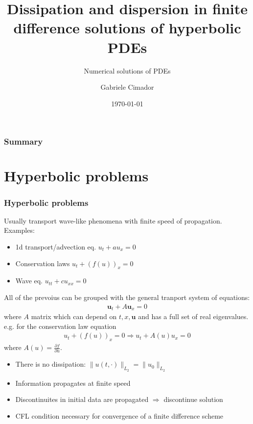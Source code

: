 \documentclass{beamer}
\title{Dissipation and dispersion in finite difference solutions of hyperbolic PDEs}
\subtitle{Numerical solutions of PDEs}
\author{Gabriele Cimador}
\institute{Data Science and Scientific computing at Università di Trieste}
\date{\today}
\begin{document}
\begin{frame}
\titlepage
\end{frame}
\begin{frame}
\frametitle{Summary}
\tableofcontents
\end{frame}
\section{Hyperbolic problems}
\begin{frame}
\frametitle{Hyperbolic problems}
Usually transport wave-like phenomena with finite speed of propagation. Examples:
\begin{itemize}
\setlength\itemsep{1em}
  \item 1d transport/advection eq. $u_t + a u_x = 0$
  \item Conservation laws $u_t + (f(u))_x = 0$
  \item Wave eq. $u_{tt} + cu_{xx} = 0$
\end{itemize}
\end{frame}
\begin{frame}
All of the prevoius can be grouped with the general tranport system of equations:
\begin{align*}
\bm{u}_t + A\bm{u}_x = 0
\end{align*}
where $A$ matrix which can depend on $t, x, \bm{u}$ and has a full set of real eigenvalues.
\\ e.g. for the conservation law equation
\begin{align*}
u_t + (f(u))_x = 0 \Rightarrow u_t + A(u)u_x = 0
\end{align*}
 where $A(u) = \frac{\partial f}{\partial u}$.
\end{frame}
\begin{frame}
\begin{itemize}
  \item There is no dissipation: $\lVert u(t,\cdot) \rVert_{L_2} = \lVert u_0\rVert_{L_2}$
  \item Information propagates at finite speed
  \item Discontinuites in initial data are propagated $\Rightarrow$ discontinue solution
  \item CFL condition necessary for convergence of a finite difference scheme
\end{itemize}
\end{frame}
\end{document}
